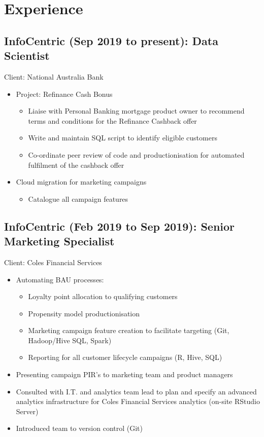 \documentclass{moderncv}
\begin{document}
\section{Experience}


\subsection{InfoCentric (Sep 2019 to present): Data Scientist}
Client: National Australia Bank
\begin{itemize}
    \item Project: Refinance Cash Bonus
        \begin{itemize}
            \item Liaise with Personal Banking mortgage product owner to recommend terms and conditions for the Refinance Cashback offer
            \item Write and maintain SQL script to identify eligible customers
            \item Co-ordinate peer review of code and productionisation for automated fulfilment of the cashback offer
        \end{itemize}
    \item Cloud migration for marketing campaigns
        \begin{itemize}
            \item Catalogue all campaign features
        \end{itemize}
\end{itemize}

\subsection{InfoCentric (Feb 2019 to Sep 2019): Senior Marketing Specialist}
Client: Coles Financial Services
\begin{itemize}
    \item Automating BAU processes:
        \begin{itemize}
            \item Loyalty point allocation to qualifying customers
            \item Propensity model productionisation 
            \item Marketing campaign feature creation to facilitate targeting (Git, Hadoop/Hive SQL, Spark)
            \item Reporting for all customer lifecycle campaigns (R, Hive, SQL)
        \end{itemize}
    \item Presenting campaign PIR’s to marketing team and product managers
    \item Consulted with I.T. and analytics team lead to plan and specify an advanced analytics infrastructure for Coles Financial Services analytics (on-site RStudio Server)
    \item Introduced team to version control (Git)
\end{itemize}
\end{document}
